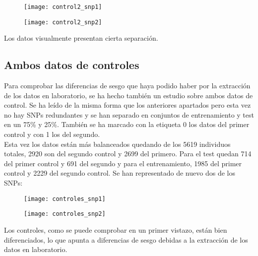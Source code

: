 \begin{figure}[H]
\centering
\begin{minipage}{.5\textwidth}
  \centering
  \texttt{[image: control2\_snp1]}
  \label{fig:snp1-control1}
\end{minipage}%
\begin{minipage}{.5\textwidth}
  \centering
  \texttt{[image: control2\_snp2]}
  \label{fig:snp2-control1}
\end{minipage}
\end{figure}

Los datos visualmente presentan cierta separación.

\subsection{Ambos datos de controles}
Para comprobar las diferencias de sesgo que haya podido haber por la extracción de los datos en laboratorio, se ha hecho también un estudio sobre ambos datos de control. Se ha leído de la misma forma que los anteriores apartados pero esta vez no hay SNPs redundantes y se han separado en conjuntos de entrenamiento y test en un 75\% y 25\%. También se ha marcado con la etiqueta 0 los datos del primer control y con 1 los del segundo.\\
Esta vez los datos están más balanceados quedando de los 5619 individuos totales, 2920 son del segundo control y 2699 del primero. Para el test quedan 714 del primer control y 691 del segundo y para el entrenamiento, 1985 del primer control y 2229 del segundo control. Se han representado de nuevo dos de los SNPs:

\begin{figure}[H]
\centering
\begin{minipage}{.5\textwidth}
  \centering
  \texttt{[image: controles\_snp1]}
  \label{fig:snp1-control1}
\end{minipage}%
\begin{minipage}{.5\textwidth}
  \centering
  \texttt{[image: controles\_snp2]}
  \label{fig:snp2-control1}
\end{minipage}
\end{figure}

Los controles, como se puede comprobar en un primer vistazo, están bien diferenciados, lo que apunta a diferencias de sesgo debidas a la extracción de los datos en laboratorio.

